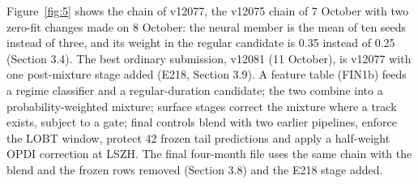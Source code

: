 \documentclass[
  manuscript=article,  %
  layout=preprint,     %
  year=2026,
  volume=4,
]{extra/joas}
\begin{document}
Figure~\ref{fig:5} shows the chain of v12077, the v12075 chain of 7 October with two zero-fit changes made on 8 October: the neural member is the mean of ten seeds instead of three, and its weight in the regular candidate is 0.35 instead of 0.25 (Section 3.4). The best ordinary submission, v12081 (11 October), is v12077 with one post-mixture stage added (E218, Section 3.9). A feature table (FIN1b) feeds a regime classifier and a regular-duration candidate; the two combine into a probability-weighted mixture; surface stages correct the mixture where a track exists, subject to a gate; final controls blend with two earlier pipelines, enforce the LOBT window, protect 42 frozen tail predictions and apply a half-weight OPDI correction at LSZH. The final four-month file uses the same chain with the blend and the frozen rows removed (Section 3.8) and the E218 stage added.
\end{document}
